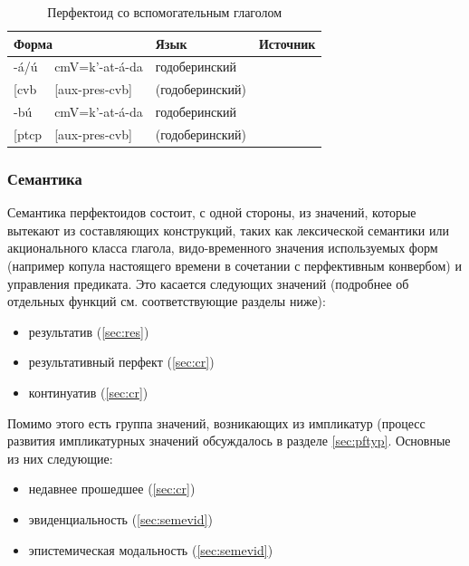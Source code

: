 \begin{table}[ht]
\caption{Перфектоид со вспомогательным глаголом}
\label{tab:aux}
\vspace{0.2cm}
\begin{center}
\begin{tabular}{ll|ll}
\multicolumn{2}{l|}{Форма} & Язык      & Источник   \\ \hline
-á/ú 	&	cmV=k'-at-á-da	&	годоберинский	&	\citep{dobrushinatatevosov1996}	\\
{[}cvb 	&	{[}aux-pres-cvb{]}	&	(годоберинский)	&		\\
-bú 	&	cmV=k'-at-á-da	&	годоберинский	&	\citep{dobrushinatatevosov1996}	\\
{[}ptcp 	&	{[}aux-pres-cvb{]}	&	(годоберинский)	&		\\
\end{tabular}
\end{center}
\end{table}


\subsubsection{Семантика} \label{sec:pfsem}

Семантика перфектоидов состоит, с одной стороны, из значений, которые вытекают из составляющих конструкций, таких как лексической семантики или акционального класса глагола, видо-временного значения используемых форм (например копула настоящего времени в сочетании с перфективным конвербом) и управления предиката. Это касается следующих значений (подробнее об отдельных функций см. соответствующие разделы ниже):

\begin{itemize}
    \item результатив (\ref{sec:res})
    \item результативный перфект (\ref{sec:cr})
    \item континуатив (\ref{sec:cr})
\end{itemize}

Помимо этого есть группа значений, возникающих из импликатур (процесс развития импликатурных значений обсуждалось в разделе \ref{sec:pftyp}. Основные из них следующие:

\begin{itemize}
    \item недавнее прошедшее (\ref{sec:cr})
    \item эвиденциальность (\ref{sec:semevid})
    \item эпистемическая модальность (\ref{sec:semevid})
\end{itemize}

